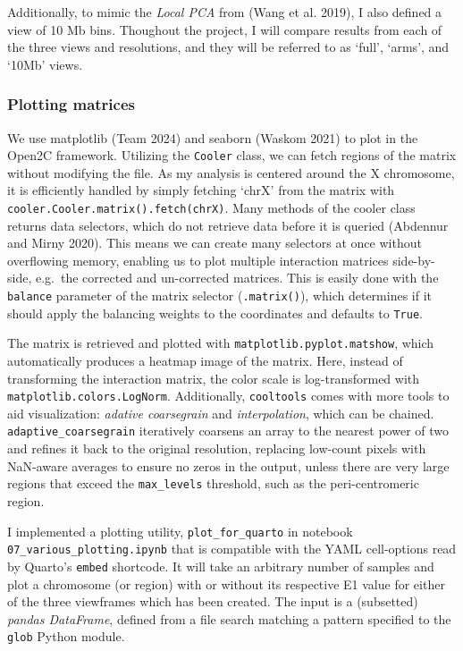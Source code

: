 \documentclass[
  11pt,
  a4paper,
]{scrbook}
\begin{document}
Additionally, to mimic the \emph{Local PCA} from (Wang et al. 2019), I
also defined a view of 10 Mb bins. Thoughout the project, I will compare
results from each of the three views and resolutions, and they will be
referred to as `full', `arms', and `10Mb' views.

\subsubsection{Plotting matrices}\label{plotting-matrices}

We use matplotlib (Team 2024) and seaborn (Waskom 2021) to plot in the
Open2C framework. Utilizing the \texttt{Cooler} class, we can fetch
regions of the matrix without modifying the file. As my analysis is
centered around the X chromosome, it is efficiently handled by simply
fetching `chrX' from the matrix with
\texttt{cooler.Cooler.matrix().fetch(\textquotesingle{}chrX\textquotesingle{})}.
Many methods of the cooler class returns data selectors, which do not
retrieve data before it is queried (Abdennur and Mirny 2020). This means
we can create many selectors at once without overflowing memory,
enabling us to plot multiple interaction matrices side-by-side, e.g.~the
corrected and un-corrected matrices. This is easily done with the
\texttt{balance} parameter of the matrix selector (\texttt{.matrix()}),
which determines if it should apply the balancing weights to the
coordinates and defaults to \texttt{True}.

The matrix is retrieved and plotted with
\texttt{matplotlib.pyplot.matshow}, which automatically produces a
heatmap image of the matrix. Here, instead of transforming the
interaction matrix, the color scale is log-transformed with
\texttt{matplotlib.colors.LogNorm}. Additionally, \texttt{cooltools}
comes with more tools to aid visualization: \emph{adative coarsegrain}
and \emph{interpolation}, which can be chained.
\texttt{adaptive\_coarsegrain} iteratively coarsens an array to the
nearest power of two and refines it back to the original resolution,
replacing low-count pixels with NaN-aware averages to ensure no zeros in
the output, unless there are very large regions that exceed the
\texttt{max\_levels} threshold, such as the peri-centromeric region.

I implemented a plotting utility, \texttt{plot\_for\_quarto} in notebook
\texttt{07\_various\_plotting.ipynb} that is compatible with the YAML
cell-options read by Quarto's \texttt{embed} shortcode. It will take an
arbitrary number of samples and plot a chromosome (or region) with or
without its respective E1 value for either of the three viewframes which
has been created. The input is a (subsetted) \emph{pandas DataFrame},
defined from a file search matching a pattern specified to the
\texttt{glob} Python module.
\end{document}
